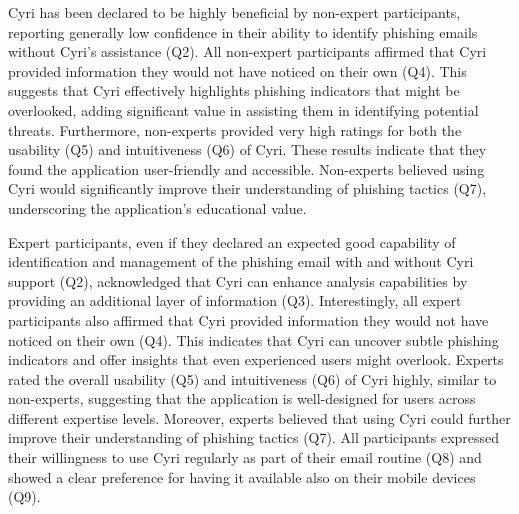 Cyri has been declared to be highly beneficial by non-expert participants, reporting generally low confidence in their ability to identify phishing emails without Cyri's assistance (Q2). All non-expert participants affirmed that Cyri provided information they would not have noticed on their own (Q4). This suggests that Cyri effectively highlights phishing indicators that might be overlooked, adding significant value in assisting them in identifying potential threats. 
Furthermore, non-experts provided very high ratings for both the usability (Q5) and intuitiveness (Q6) of Cyri. These results indicate that they found the application user-friendly and accessible. Non-experts believed using Cyri would significantly improve their understanding of phishing tactics (Q7), underscoring the application’s educational value.

Expert participants, even if they declared an expected good capability of identification and management of the phishing email with and without Cyri support (Q2), acknowledged that Cyri can enhance analysis capabilities by providing an additional layer of information (Q3). Interestingly, all expert participants also affirmed that Cyri provided information they would not have noticed on their own (Q4). This indicates that Cyri can uncover subtle phishing indicators and offer insights that even experienced users might overlook. Experts rated the overall usability (Q5) and intuitiveness (Q6) of Cyri highly, similar to non-experts, suggesting that the application is well-designed for users across different expertise levels. Moreover, experts believed that using Cyri could further improve their understanding of phishing tactics (Q7).
All participants expressed their willingness to use Cyri regularly as part of their email routine (Q8) and showed a clear preference for having it available also on their mobile devices (Q9).